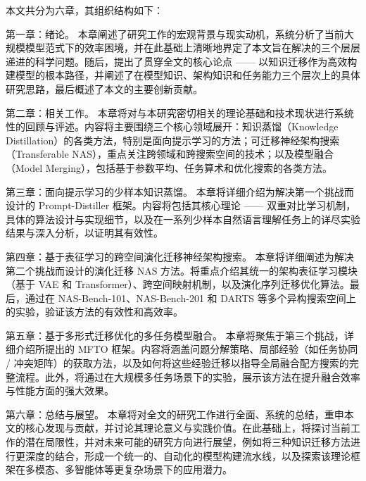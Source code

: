 \documentclass[../main.tex]{subfiles}
\begin{document}
本文共分为六章，其组织结构如下：

第一章：绪论。 本章阐述了研究工作的宏观背景与现实动机，系统分析了当前大规模模型范式下的效率困境，并在此基础上清晰地界定了本文旨在解决的三个层层递进的科学问题。随后，提出了贯穿全文的核心论点 —— 以知识迁移作为高效构建模型的根本路径，并阐述了在模型知识、架构知识和任务能力三个层次上的具体研究思路，最后概述了本文的主要创新贡献。

第二章：相关工作。 本章将对与本研究密切相关的理论基础和技术现状进行系统性的回顾与评述。内容将主要围绕三个核心领域展开：知识蒸馏（Knowledge Distillation）的各类方法，特别是面向提示学习的方法；可迁移神经架构搜索（Transferable NAS），重点关注跨领域和跨搜索空间的技术；以及模型融合（Model Merging），包括基于参数平均、任务算术和优化搜索的各类方法。

第三章：面向提示学习的少样本知识蒸馏。 本章将详细介绍为解决第一个挑战而设计的 Prompt-Distiller 框架。内容将包括其核心理论 —— 双重对比学习机制，具体的算法设计与实现细节，以及在一系列少样本自然语言理解任务上的详尽实验结果与深入分析，以证明其有效性。

第四章：基于表征学习的跨空间演化迁移神经架构搜索。 本章将详细阐述为解决第二个挑战而设计的演化迁移 NAS 方法。将重点介绍其统一的架构表征学习模块（基于 VAE 和 Transformer）、跨空间映射机制，以及演化序列迁移优化算法。最后，通过在 NAS-Bench-101、NAS-Bench-201 和 DARTS 等多个异构搜索空间上的实验，验证该方法的有效性和高效率。

第五章：基于多形式迁移优化的多任务模型融合。 本章将聚焦于第三个挑战，详细介绍所提出的 MFTO 框架。内容将涵盖问题分解策略、局部经验（如任务协同 / 冲突矩阵）的获取方法，以及如何将这些经验迁移以指导全局融合配方搜索的完整流程。此外，将通过在大规模多任务场景下的实验，展示该方法在提升融合效率与性能方面的强大效果。

第六章：总结与展望。 本章将对全文的研究工作进行全面、系统的总结，重申本文的核心发现与贡献，并讨论其理论意义与实践价值。在此基础上，将探讨当前工作的潜在局限性，并对未来可能的研究方向进行展望，例如将三种知识迁移方法进行更深度的结合，形成一个统一的、自动化的模型构建流水线，以及探索该理论框架在多模态、多智能体等更复杂场景下的应用潜力。
\end{document}
